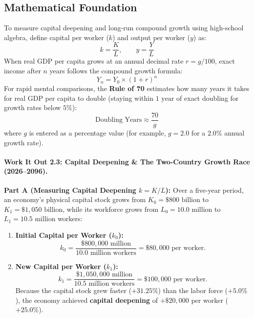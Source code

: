 \documentclass[11pt,letterpaper]{article}
\begin{document}
\subsection*{Mathematical Foundation}
To measure capital deepening and long-run compound growth using high-school algebra, define capital per worker ($k$) and output per worker ($y$) as:
\begin{equation}
k = \frac{K}{L}, \qquad y = \frac{Y}{L}
\end{equation}
When real GDP per capita grows at an annual decimal rate $r = g/100$, exact income after $n$ years follows the compound growth formula:
\begin{equation}
Y_n = Y_0 \times (1 + r)^n
\end{equation}
For rapid mental comparisons, the \textbf{Rule of 70} estimates how many years it takes for real GDP per capita to double (staying within $1\text{ year}$ of exact doubling for growth rates below $5\%$):
\begin{equation}
\text{Doubling Years} \approx \frac{70}{g}
\end{equation}
where $g$ is entered as a percentage value (for example, $g = 2.0$ for a $2.0\%$ annual growth rate).

\paragraph{Work It Out 2.3: Capital Deepening \& The Two-Country Growth Race (2026--2096).}
\textbf{Part A (Measuring Capital Deepening $k = K/L$):} Over a five-year period, an economy's physical capital stock grows from $K_0 = \$800\text{ billion}$ to $K_1 = \$1,050\text{ billion}$, while its workforce grows from $L_0 = 10.0\text{ million}$ to $L_1 = 10.5\text{ million}$ workers:
\begin{enumerate}
  \item \textbf{Initial Capital per Worker ($k_0$):}
  $$k_0 = \frac{\$800,000\text{ million}}{10.0\text{ million workers}} = \$80,000\text{ per worker}.$$
  \item \textbf{New Capital per Worker ($k_1$):}
  $$k_1 = \frac{\$1,050,000\text{ million}}{10.5\text{ million workers}} = \$100,000\text{ per worker}.$$
  Because the capital stock grew faster ($+31.25\%$) than the labor force ($+5.0\%$), the economy achieved \textbf{capital deepening} of $+\$20,000$ per worker ($+25.0\%$).
\end{enumerate}
\end{document}
